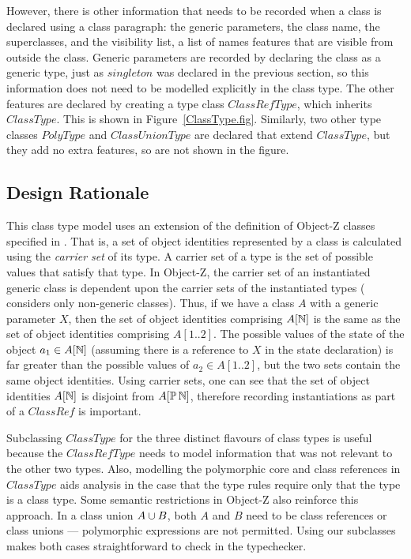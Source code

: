 However, there is other information that needs to be recorded when a
class is declared using a class paragraph: the generic parameters, the
class name, the superclasses, and the visibility list, a list of names
features that are visible from outside the class. Generic parameters
are recorded by declaring the class as a generic type, just as
$singleton$ was declared in the previous section, so this information
does not need to be modelled explicitly in the class type. The other
features are declared by creating a type class $ClassRefType$, which
inherits $ClassType$. This is shown in
Figure~\ref{ClassType.fig}. Similarly, two other type classes
$PolyType$ and $ClassUnionType$ are declared that extend $ClassType$,
but they add no extra features, so are not shown in the figure.

\subsection{Design Rationale}

This class type model uses an extension of the definition of Object-Z
classes specified in \cite{griffiths94}. That is, a set of object
identities represented by a class is calculated using the {\em carrier
set} of its type. A carrier set of a type is the set of possible
values that satisfy that type. In Object-Z, the carrier set of an
instantiated generic class is dependent upon the carrier sets of the
instantiated types (\cite{griffiths94} considers only non-generic
classes). Thus, if we have a class $A$ with a generic parameter $X$,
then the set of object identities comprising $A[{\mathbb N}]$ is the same as
the set of object identities comprising $A[1..2]$. The possible values
of the state of the object $a_1 \in A[{\mathbb N}]$ (assuming there is a
reference to $X$ in the state declaration) is far greater than the
possible values of $a_2 \in A[1..2]$, but the two sets contain the
same object identities. Using carrier sets, one can see that the set
of object identities $A[{\mathbb N}]$ is disjoint from $A[\power
\nat]$, therefore recording instantiations as part of a $ClassRef$
is important.

Subclassing $ClassType$ for the three distinct flavours of class types
is useful because the $ClassRefType$ needs to model information that
was not relevant to the other two types. Also, modelling the
polymorphic core and class references in $ClassType$ aids analysis in
the case that the type rules require only that the type is a class
type. Some semantic restrictions in Object-Z also reinforce this
approach. In a class union $A \classuni B$, both $A$ and $B$ need to
be class references or class unions --- polymorphic expressions are
not permitted. Using our subclasses makes both cases straightforward
to check in the typechecker.

